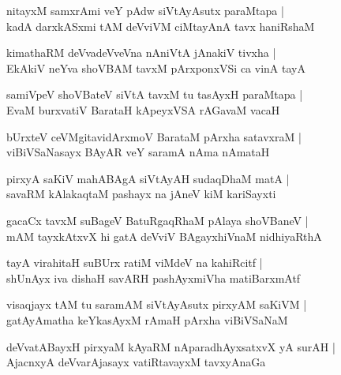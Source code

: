 \begin{shloka}
nitayxM samxrAmi veY pAdw siVtAyAsutx paraMtapa |\\
kadA darxkASxmi tAM deVviVM ciMtayAnA tavx haniRshaM
\end{shloka}

\begin{shloka}
kimathaRM deVvadeVveVna nAniVtA jAnakiV tivxha |\\
EkAkiV neYva shoVBAM tavxM pArxponxVSi ca vinA tayA
\end{shloka}

\begin{shloka}
samiVpeV shoVBateV siVtA tavxM tu tasAyxH paraMtapa |\\
EvaM burxvatiV BarataH kApeyxVSA rAGavaM vacaH 
\end{shloka}

\begin{shloka}
bUrxteV ceVMgitavidArxmoV BarataM pArxha satavxraM |\\
viBiVSaNasayx BAyAR veY saramA nAma nAmataH 
\end{shloka}

\begin{shloka}
pirxyA saKiV mahABAgA siVtAyAH sudaqDhaM matA |\\
savaRM kAlakaqtaM pashayx na jAneV kiM kariSayxti 
\end{shloka}

\begin{shloka}
gacaCx tavxM suBageV BatuRgaqRhaM pAlaya shoVBaneV |\\
mAM tayxkAtxvX hi gatA deVviV BAgayxhiVnaM nidhiyaRthA
\end{shloka}

\begin{shloka}
tayA virahitaH suBUrx ratiM viMdeV na kahiRcitf |\\
shUnAyx iva dishaH savARH pashAyxmiVha matiBarxmAtf 
\end{shloka}

\begin{shloka}
visaqjayx tAM tu saramAM siVtAyAsutx pirxyAM saKiVM |\\
gatAyAmatha keYkasAyxM rAmaH pArxha viBiVSaNaM 
\end{shloka}

\begin{shloka}
deVvatABayxH pirxyaM kAyaRM nAparadhAyxsatxvX yA surAH |\\
AjacnxyA deVvarAjasayx vatiRtavayxM tavxyAnaGa
\end{shloka}

